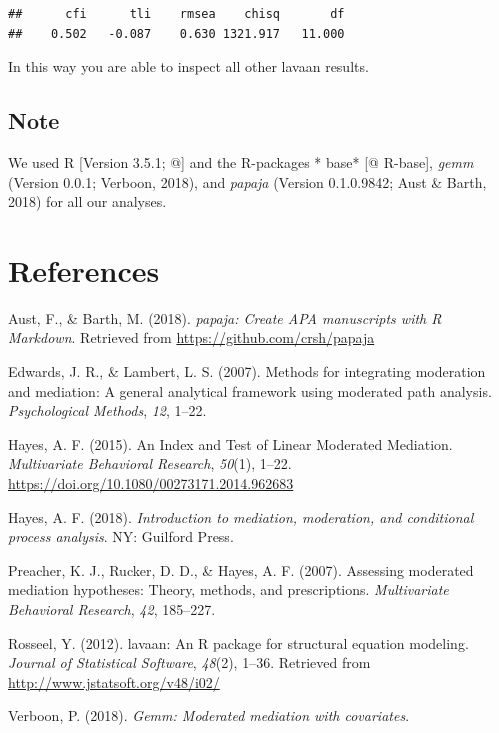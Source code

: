 \documentclass[man,floatsintext]{apa6}
\theoremstyle{definition}
\theoremstyle{definition}
\theoremstyle{definition}
\theoremstyle{remark}
\begin{document}
\begin{verbatim}
##      cfi      tli    rmsea    chisq       df 
##    0.502   -0.087    0.630 1321.917   11.000
\end{verbatim}

In this way you are able to inspect all other lavaan results.

\subsection{Note}\label{note}

We used R {[}Version 3.5.1; @{]} and the R-packages * base* {[}@
R-base{]}, \emph{gemm} (Version 0.0.1; Verboon, 2018), and \emph{papaja}
(Version 0.1.0.9842; Aust \& Barth, 2018) for all our analyses.

\newpage

\section{References}\label{references}

\begingroup
\setlength{\parindent}{-0.5in} \setlength{\leftskip}{0.5in}

\hypertarget{refs}{}
\hypertarget{ref-R-papaja}{}
Aust, F., \& Barth, M. (2018). \emph{papaja: Create APA manuscripts with
R Markdown}. Retrieved from \url{https://github.com/crsh/papaja}

\hypertarget{ref-Edwards2007}{}
Edwards, J. R., \& Lambert, L. S. (2007). Methods for integrating
moderation and mediation: A general analytical framework using moderated
path analysis. \emph{Psychological Methods}, \emph{12}, 1--22.

\hypertarget{ref-Hayes2015}{}
Hayes, A. F. (2015). An Index and Test of Linear Moderated Mediation.
\emph{Multivariate Behavioral Research}, \emph{50}(1), 1--22.
\url{https://doi.org/10.1080/00273171.2014.962683}

\hypertarget{ref-Hayes2018}{}
Hayes, A. F. (2018). \emph{Introduction to mediation, moderation, and
conditional process analysis}. NY: Guilford Press.

\hypertarget{ref-Preacher2007}{}
Preacher, K. J., Rucker, D. D., \& Hayes, A. F. (2007). Assessing
moderated mediation hypotheses: Theory, methods, and prescriptions.
\emph{Multivariate Behavioral Research}, \emph{42}, 185--227.

\hypertarget{ref-Rosseel2012}{}
Rosseel, Y. (2012). lavaan: An R package for structural equation
modeling. \emph{Journal of Statistical Software}, \emph{48}(2), 1--36.
Retrieved from \url{http://www.jstatsoft.org/v48/i02/}

\hypertarget{ref-R-gemm}{}
Verboon, P. (2018). \emph{Gemm: Moderated mediation with covariates}.

\endgroup
\end{document}
